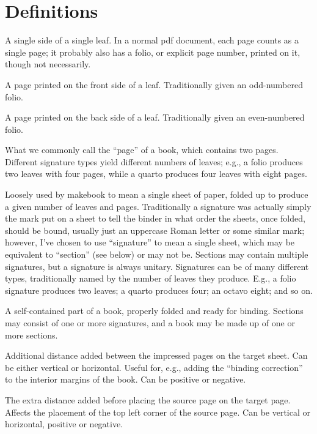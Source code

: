 \documentclass[12pt,twoside,final]{extarticle}
\begin{document}
\section{Definitions}
\begin{description}[noitemsep]
\item[page]A single side of a single leaf.  In a normal pdf document, each page counts as a single page; it probably also has a folio, or explicit page number, printed on it, though not necessarily.
\item[recto]A page printed on the front side of a leaf. Traditionally given an odd-numbered folio.
\item[verso]A page printed on the back side of a leaf. Traditionally given an even-numbered folio.
\item[leaf]What we commonly call the ``page'' of a book, which contains two pages. Different signature types yield different numbers of leaves; e.g., a folio produces two leaves with four pages, while a quarto produces four leaves with eight pages.
\item[signature]Loosely used by makebook to mean a single sheet of paper, folded up to produce a given number of leaves and pages. Traditionally a signature was actually simply the mark put on a sheet to tell the binder in what order the sheets, once folded, should be bound, usually just an uppercase Roman letter or some similar mark; however, I've chosen to use ``signature'' to mean a single sheet, which may  be equivalent to ``section'' (see below) or may not be. Sections may contain multiple signatures, but a signature is always unitary. Signatures can be of many different types, traditionally named by the number of leaves they produce. E.g., a folio signature produces two leaves; a quarto produces four; an octavo eight; and so on.
\item[section]A self-contained part of a book, properly folded and ready for binding. Sections may consist of one or more signatures, and a book may be made up of one or more sections.
\item[delta]Additional distance added between the impressed pages on the target sheet. Can be either vertical or horizontal. Useful for, e.g., adding the ``binding correction'' to the interior margins of the book. Can be positive or negative.
\item[offset]The extra distance added before placing the source page on the target page. Affects the placement of the top left corner of the source page. Can be vertical or horizontal, positive or negative.
\end{description}
\end{document}
